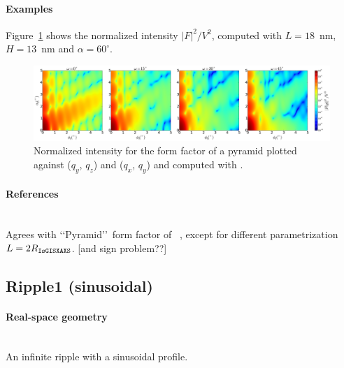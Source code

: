 \paragraph{Examples}
Figure~\ref{fig:FFPyramidEx} shows the normalized intensity
$|F|^2/V^2$, computed with $L=18$~nm, $H=13$~nm and
$\alpha=60^{\circ}$.

\begin{figure}[h]
\begin{center}
\includegraphics[width=\textwidth]{fig/ff2/ff_pyramid.pdf}
\end{center}
\caption{Normalized intensity for the form factor of a
  pyramid plotted against ($q_y$, $q_z$) and  
  ($q_x$, $q_y$) and computed with  .}
\label{fig:FFPyramidEx}
\end{figure}

\paragraph{References}\strut\\
Agrees with \lq\lq Pyramid\rq\rq\ form factor of \IsGISAXS~\cite{Laz02},
except for different parametrization $L=2R_{\rm{\texttt{IsGISXAXS}}}$.
[and sign problem??]

\clearpage
\subsection{Ripple1 (sinusoidal)} \label{sec:Ripple1}  

\paragraph{Real-space geometry}\strut\\
An infinite ripple with a sinusoidal profile.

